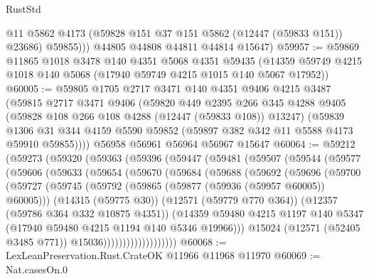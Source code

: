 \begin{lexlean}{RustStd}
\begin{coremodule}
            @11
            @5862
            @4173
            (@59828 @151 @37 @151 @5862 (@12447 (@59833 @151)) @23686)
            @59855)))
      @44805
      @44808
      @44811
      @44814
      @15647)
@59957 := @59869
    @11865
    @1018
    @3478
    @140
    @4351
    @5068
    @4351
    @59435
    (@14359 @59749 @4215 @1018 @140 @5068 (@17940 @59749 @4215 @1015 @140 @5067 @17952))
@60005 := @59805
    @1705
    @2717
    @3471
    @140
    @4351
    @9406
    @4215
    @3487
    (@59815
      @2717
      @3471
      @9406
      (@59820
        @449
        @2395
        @266
        @345
        @4288
        @9405
        (@59828 @108 @266 @108 @4288 (@12447 (@59833 @108)) @13247)
        (@59839
          @1306
          @31
          @344
          @4159
          @5590
          @59852
          (@59897 @382 @342 @11 @5588 @4173 @59910 @59855))))
    @56958
    @56961
    @56964
    @56967
    @15647
@60064 := @59212
    (@59273
      (@59320
        (@59363
          (@59396
            (@59447
              (@59481
                (@59507
                  (@59544
                    (@59577
                      (@59606
                        (@59633
                          (@59654
                            (@59670
                              (@59684
                                (@59688
                                  (@59692
                                    (@59696
                                      (@59700
                                        (@59727
                                          (@59745
                                            (@59792
                                              (@59865 (@59877 (@59936 (@59957 @60005)) @60005)))
                                            (@14315 (@59775 @30))
                                            (@12571 (@59779 @770 @364))
                                            (@12357 (@59786 @364 @332 @10875 @4351))
                                            (@14359
                                              @59480
                                              @4215
                                              @1197
                                              @140
                                              @5347
                                              (@17940 @59480 @4215 @1194 @140 @5346 @19966)))
                                          @15024
                                          (@12571 (@52405 @3485 @771))
                                          @15036)))))))))))))))))))
@60068 := LexLeanPreservation.Rust.CrateOK @11966 @11968 @11970
@60069 := Nat.casesOn.{0}

\end{coremodule}
\end{lexlean}
